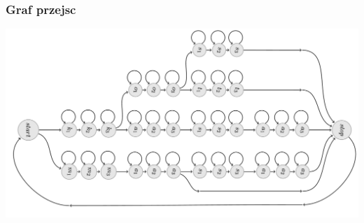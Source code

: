 \documentclass[mathserif, serif]{beamer}
\begin{document}
	\begin{frame}
		\frametitle{Graf przejsc}
		\footnotesize
		
		\includegraphics[scale=0.39, trim=3cm 0 0 0cm]{tree2}
	\end{frame}
	
\end{document}

